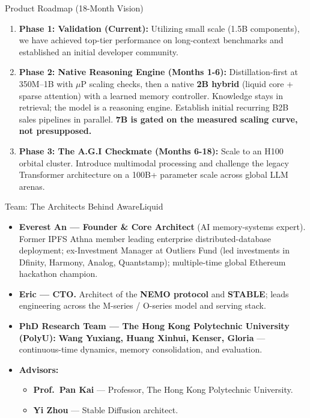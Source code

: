 ﻿\documentclass[aspectratio=169, 10pt]{beamer}
\begin{document}
\begin{frame}{Product Roadmap (18-Month Vision)}
\begin{enumerate}
    \item \textbf{Phase 1: Validation (Current):} Utilizing small scale (1.5B components), we have achieved top-tier performance on long-context benchmarks and established an initial developer community.
    \vspace{0.4em}
    \item \textbf{Phase 2: Native Reasoning Engine (Months 1-6):} Distillation-first at 350M--1B with $\mu$P scaling checks, then a native \textbf{2B hybrid} (liquid core + sparse attention) with a learned memory controller. Knowledge stays in retrieval; the model is a reasoning engine. Establish initial recurring B2B sales pipelines in parallel. \textbf{7B is gated on the measured scaling curve, not presupposed.}
    \vspace{0.4em}
    \item \textbf{Phase 3: The A.G.I Checkmate (Months 6-18):} Scale to an H100 orbital cluster. Introduce multimodal processing and challenge the legacy Transformer architecture on a 100B+ parameter scale across global LLM arenas.
\end{enumerate}
\end{frame}

\begin{frame}{Team: The Architects Behind AwareLiquid}
\small
\begin{itemize}\itemsep=0.4em
    \item \textbf{Everest An --- Founder \& Core Architect} (AI memory-systems expert). Former IPFS Athna member leading enterprise distributed-database deployment; ex-Investment Manager at Outliers Fund (led investments in Dfinity, Harmony, Analog, Quantstamp); multiple-time global Ethereum hackathon champion.
    \item \textbf{Eric --- CTO.} Architect of the \textbf{NEMO protocol} and \textbf{STABLE}; leads engineering across the M-series / O-series model and serving stack.
    \item \textbf{PhD Research Team --- The Hong Kong Polytechnic University (PolyU):} \textbf{Wang Yuxiang, Huang Xinhui, Kenser, Gloria} --- continuous-time dynamics, memory consolidation, and evaluation.
    \vspace{0.3em}
    \item \textbf{Advisors:}
    \begin{itemize}
        \item \textbf{Prof.\ Pan Kai} --- Professor, The Hong Kong Polytechnic University.
        \item \textbf{Yi Zhou} --- Stable Diffusion architect.
    \end{itemize}
\end{itemize}
\end{frame}
\end{document}
